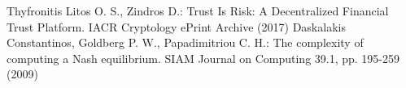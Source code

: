 \begin{thebibliography}{40}
  Thyfronitis Litos O. S., Zindros D.: Trust Is Risk: A Decentralized Financial Trust Platform. IACR Cryptology ePrint
  Archive (2017)
  Daskalakis Constantinos, Goldberg P. W., Papadimitriou C. H.: The complexity of computing a Nash equilibrium.
  SIAM Journal on Computing 39.1, pp. 195-259 (2009)

\end{thebibliography}
